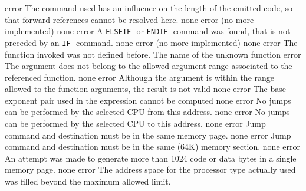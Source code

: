 \documentclass[12pt,twoside]{report}
\newcommand{\tty}[1]{{\tt #1}}
\begin{document}
\begin{description}
               {error}
               {The command used has an influence on the length of the
                emitted code, so that forward references cannot be resolved
                here.}
               {none}
               {error}
               {(no more implemented)}
               {none}
               {error}
               {A \tty{ELSEIF}- or \tty{ENDIF}- command was found, that is not preceded
                by an \tty{IF}- command.}
               {none}
               {error}
               {(no more implemented)}
               {none}
               {error}
               {The function invoked was not defined before.}
               {The name of the unknown function}
               {error}
               {The argument does not belong to the allowed argument range
                associated to the referenced function.}
               {none}
               {error}
               {Although the argument is within the range allowed to the
                function arguments, the result is not valid}
               {none}
               {error}
               {The base-exponent pair used in the expression cannot be
                computed}
               {none}
               {error}
               {No jumps can be performed by the selected CPU from this
                address.}
               {none}
               {error}
               {No jumps can be performed by the selected CPU to this
                address.}
               {none}
               {error}
               {Jump command and destination must be in the same memory
                page.}
               {none}
               {error}
               {Jump command and destination must be in the same (64K)
                memory section.}
               {none}
               {error}
               {An attempt was made to generate more than 1024 code or
                data bytes in a single memory page.}
               {none}
               {error}
               {The address space for the processor type actually used was
                filled beyond the maximum allowed limit.}

\end{description}
\end{document}
